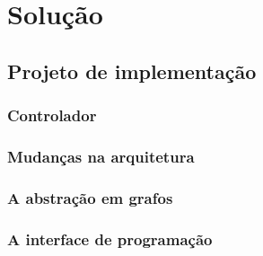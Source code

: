 \chapter{Solução}


\section{Projeto de implementação}


\subsection{Controlador}

\subsection{Mudanças na arquitetura}

\subsection{A abstração em grafos}

\subsection{A interface de programação}
